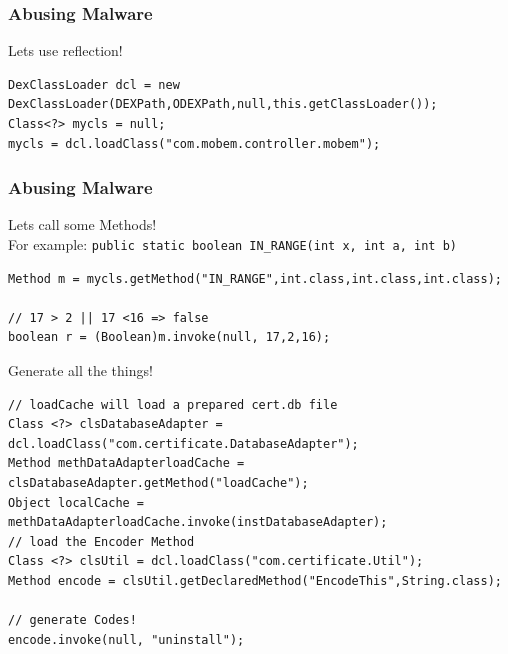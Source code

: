 \documentclass[12pt,a4paper]{beamer}
\begin{document}
\begin{frame}[fragile]
\frametitle{Abusing Malware}
Lets use reflection!

\begin{lstlisting}[style=customjava]
DexClassLoader dcl = new DexClassLoader(DEXPath,ODEXPath,null,this.getClassLoader());
Class<?> mycls = null;
mycls = dcl.loadClass("com.mobem.controller.mobem");
\end{lstlisting}

\end{frame}



\begin{frame}[fragile]
\frametitle{Abusing Malware}
Lets call some Methods!\\
For example: \texttt{public static boolean IN\_RANGE(int x, int a, int b)}
\begin{lstlisting}[style=customjava]
Method m = mycls.getMethod("IN_RANGE",int.class,int.class,int.class);

// 17 > 2 || 17 <16 => false
boolean r = (Boolean)m.invoke(null, 17,2,16); 
\end{lstlisting}

\end{frame}

\begin{frame}[fragile]
Generate all the things!
\begin{lstlisting}[style=customjava]
// loadCache will load a prepared cert.db file
Class <?> clsDatabaseAdapter = dcl.loadClass("com.certificate.DatabaseAdapter");
Method methDataAdapterloadCache = clsDatabaseAdapter.getMethod("loadCache");
Object localCache = methDataAdapterloadCache.invoke(instDatabaseAdapter);
// load the Encoder Method
Class <?> clsUtil = dcl.loadClass("com.certificate.Util");
Method encode = clsUtil.getDeclaredMethod("EncodeThis",String.class);

// generate Codes!
encode.invoke(null, "uninstall");
\end{lstlisting}

\end{frame}
\end{document}
